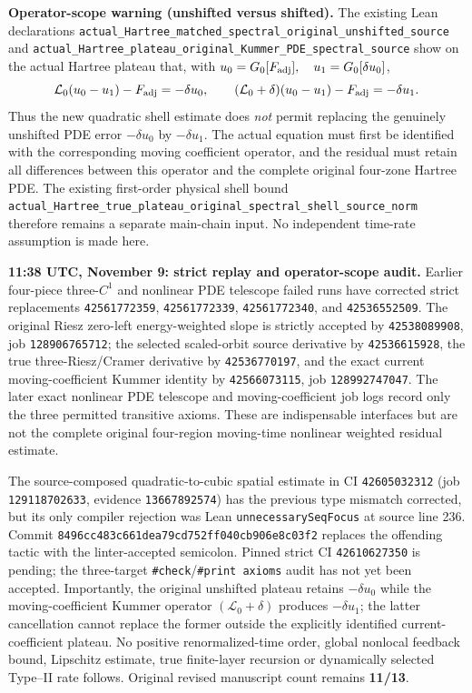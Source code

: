 \documentclass[11pt]{amsart}
\begin{document}
\medskip
\noindent\textbf{Operator-scope warning (unshifted versus shifted).}
The existing Lean declarations
\texttt{actual\_Hartree\_matched\_spectral\_original\_unshifted\_source}
and
\texttt{actual\_Hartree\_plateau\_original\_Kummer\_PDE\_spectral\_source}
show on the actual Hartree plateau that, with
\(u_0=G_0[F_{\rm adj}],\quad u_1=G_0[\delta u_0]\),
\[
 \mathcal L_0(u_0-u_1)-F_{\rm adj}=-\delta u_0,
 \qquad
 (\mathcal L_0+\delta)(u_0-u_1)-F_{\rm adj}=-\delta u_1.
\]
Thus the new quadratic shell estimate does \emph{not} permit replacing
the genuinely unshifted PDE error \(-\delta u_0\) by
\(-\delta u_1\). The actual equation must first be identified
with the corresponding moving coefficient operator, and the residual
must retain all differences between this operator and the complete
original four-zone Hartree PDE. The existing first-order physical
shell bound \texttt{actual\_Hartree\_true\_plateau\_original\_spectral\_shell\_source\_norm}
therefore remains a separate main-chain input. No independent
time-rate assumption is made here.


\medskip
\noindent\textbf{11:38 UTC, November 9: strict replay and operator-scope audit.}
Earlier four-piece three-$C^1$ and nonlinear PDE telescope failed runs
have corrected strict replacements
\texttt{42561772359}, \texttt{42561772339},
\texttt{42561772340}, and \texttt{42536552509}.
The original Riesz zero-left energy-weighted slope is strictly accepted by
\texttt{42538089908}, job \texttt{128906765712};
the selected scaled-orbit source derivative by \texttt{42536615928},
the true three-Riesz/Cramer derivative by \texttt{42536770197},
and the exact current moving-coefficient Kummer identity by
\texttt{42566073115}, job \texttt{128992747047}.
The later exact nonlinear PDE telescope and moving-coefficient job
logs record only the three permitted transitive axioms.
These are indispensable interfaces but are not the complete original
four-region moving-time nonlinear weighted residual estimate.

The source-composed quadratic-to-cubic spatial estimate in CI
\texttt{42605032312} (job \texttt{129118702633},
evidence \texttt{13667892574}) has the previous type mismatch
corrected, but its only compiler rejection was Lean
\texttt{unnecessarySeqFocus} at source line 236.
Commit \texttt{8496cc483c661dea79cd752ff040cb906e8c03f2}
replaces the offending tactic with the linter-accepted semicolon.
Pinned strict CI \texttt{42610627350} is pending; the three-target
\texttt{\#check}/\texttt{\#print axioms} audit has not yet been accepted.
Importantly, the original unshifted plateau retains
$-\delta u_0$ while the moving-coefficient Kummer operator
$(\mathcal L_0+\delta)$ produces $-\delta u_1$; the latter
cancellation cannot replace the former outside the explicitly
identified current-coefficient plateau. No positive renormalized-time
order, global nonlocal feedback bound, Lipschitz estimate, true
finite-layer recursion or dynamically selected Type--II rate follows.
Original revised manuscript count remains \textbf{11/13}.
\end{document}

